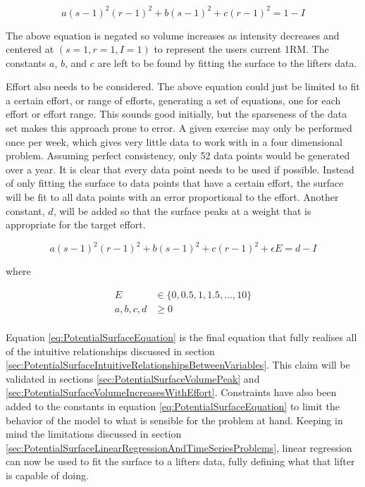
\begin{equation*}
    a(s-1)^2(r-1)^2+b(s-1)^2+c(r-1)^2=1-I
\end{equation*}

The above equation is negated so volume increases as intensity decreases and centered at $(s=1,r=1,I=1)$ to represent the users current 1RM. The constants $a$, $b$, and $c$ are left to be found by fitting the surface to the lifters data.

Effort also needs to be considered. The above equation could just be limited to fit a certain effort, or range of efforts, generating a set of equations, one for each effort or effort range. This sounds good initially, but the sparseness of the data set makes this approach prone to error. A given exercise may only be performed once per week, which gives very little data to work with in a four dimensional problem. Assuming perfect consistency, only 52 data points would be generated over a year. It is clear that every data point needs to be used if possible. Instead of only fitting the surface to data points that have a certain effort, the surface will be fit to all data points with an error proportional to the effort. Another constant, $d$, will be added so that the surface peaks at a weight that is appropriate for the target effort.

\begin{equation}
    \label{eq:PotentialSurfaceEquation}
    a(s-1)^2(r-1)^2+b(s-1)^2+c(r-1)^2+\epsilon E=d-I
\end{equation}
\centerline{where}
\begin{equation*}
    \begin{split}
        E & \in \{ 0,0.5,1,1.5,...,10 \} \\
        a,b,c,d & \ge 0 \\
    \end{split}
\end{equation*}

Equation \ref{eq:PotentialSurfaceEquation} is the final equation that fully realises all of the intuitive relationships discussed in section \ref{sec:PotentialSurfaceIntuitiveRelationshipsBetweenVariables}. This claim will be validated in sections \ref{sec:PotentialSurfaceVolumePeak} and \ref{sec:PotentialSurfaceVolumeIncreasesWithEffort}. Constraints have also been added to the constants in equation \ref{eq:PotentialSurfaceEquation} to limit the behavior of the model to what is sensible for the problem at hand. Keeping in mind the limitations discussed in section \ref{sec:PotentialSurfaceLinearRegressionAndTimeSeriesProblems}, linear regression can now be used to fit the surface to a lifters data, fully defining what that lifter is capable of doing.

